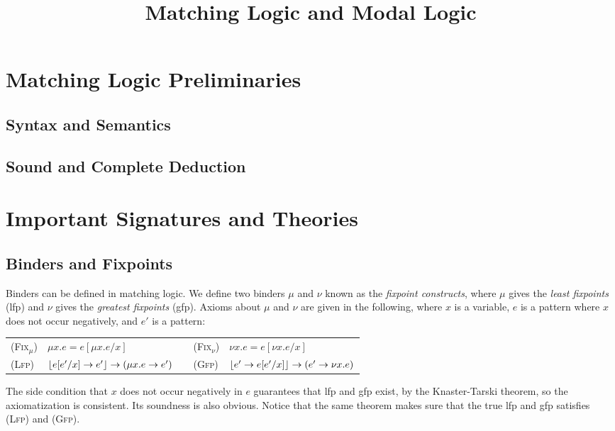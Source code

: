 \documentclass[acmsmall]{acmart}
\title{Matching Logic and Modal Logic}
\DeclarePairedDelimiter{\floor}{\lfloor}{\rfloor}
\newcommand{\prule}[1]{\textnormal{(\textsc{#1})}}
\newcommand{\Lfp}{\prule{Lfp}\xspace}
\newcommand{\Gfp}{\prule{Gfp}\xspace}
\begin{document}
\maketitle

\makeatletter
\providecommand\@dotsep{5}
\makeatother
\listoftodos\relax

\tableofcontents

\section{Matching Logic Preliminaries}

\subsection{Syntax and Semantics}

\subsection{Sound and Complete Deduction}

\section{Important Signatures and Theories}

\subsection{Binders and Fixpoints}

Binders can be defined in matching logic.
We define two binders $\mu$ and $\nu$ known as
the \emph{fixpoint constructs},
where $\mu$ gives the \emph{least fixpoints} (lfp)
and $\nu$ gives the \emph{greatest fixpoints} (gfp).
Axioms about $\mu$ and $\nu$ are given in the following,
where $x$ is a variable,
$e$ is a pattern where $x$ does not occur negatively,
and $e'$ is a pattern:
\begin{center}
\begin{tabular}{llp{1cm}ll}
\prule{Fix$_\mu$} &
$\mu x . e = e[\mu x . e / x]$
&&
\prule{Fix$_\nu$} &
$\nu x . e = e[\nu x . e / x]$
\\
\prule{Lfp} &
$\floor{e[e'/x] \to e'} \to (\mu x . e \to e') $
&&
\prule{Gfp} &
$\floor{e' \to e[e'/x]} \to (e' \to \nu x . e) $
\end{tabular}
\end{center}
The side condition that $x$ does not occur negatively
in $e$ guarantees that lfp and gfp exist, by the Knaster-Tarski theorem,
so the axiomatization is consistent.
Its soundness is also obvious.
Notice that the same theorem makes sure that
the true lfp and gfp satisfies \Lfp and \Gfp.
\end{document}
